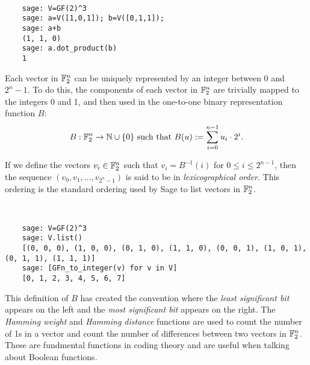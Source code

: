 \begin{example}
  \ 
  \begin{lstlisting}
    sage: V=GF(2)^3
    sage: a=V([1,0,1]); b=V([0,1,1]);
    sage: a+b
    (1, 1, 0)
    sage: a.dot_product(b)
    1
  \end{lstlisting}
\end{example}

\par Each vector in $\mathbb{F}_2^n$ can be uniquely represented by an integer
between $0$ and $2^n-1$. To do this, the components of each vector in
$\mathbb{F}_2^n$ are trivially mapped to the integers 0 and 1, and then used in
the one-to-one binary representation function $B$:
\begin{equation}
  B:\gftwo^n\rightarrow\nnn\cup\{0\}\ \allowbreak
  {\rm such\ that }\ \allowbreak B(u) := \sum_{i=0}^{n-1}u_i\cdot2^i.
\end{equation}

\par If we define the vectors $v_i\in\mathbb{F}_2^n$ such that $v_i=B^{-1}(i)$
for $0\leq i\leq2^{n-1}$, then the sequence $(v_0,v_1,\allowbreak \dots,
\allowbreak v_{2^n-1})$ is said to be in {\em lexicographical order}. This
ordering is the standard ordering used by Sage to list vectors in $\mathbb{F}_2^n$.

\begin{example}
  \ 
  \begin{lstlisting}
    sage: V=GF(2)^3
    sage: V.list()
    [(0, 0, 0), (1, 0, 0), (0, 1, 0), (1, 1, 0), (0, 0, 1), (1, 0, 1), (0, 1, 1), (1, 1, 1)]
    sage: [GFn_to_integer(v) for v in V]
    [0, 1, 2, 3, 4, 5, 6, 7]
  \end{lstlisting}
\end{example}

\par This definition of $B$ has created the convention where the
{\em least significant bit} appears on the left and the 
{\em most significant bit} appears on the right. The {\it Hamming weight}
and {\it Hamming distance} functions are used to count the number of 1s in a
vector and count the number of differences between two vectors in
$\mathbb{F}_2^n$. These are fundmental functions in coding theory and are useful
when talking about Boolean functions.

